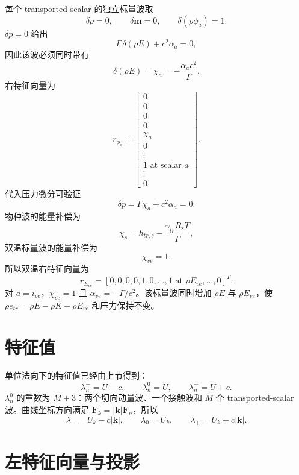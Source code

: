 \documentclass[11pt,a4paper,fontset=fandol]{ctexart}
\newcommand{\ve}{ve}
\newcommand{\tr}{tr}
\newcommand{\kk}{\bm{k}}
\newcommand{\FF}{\bm{F}}
\newcommand{\Gammaone}{\Gamma}
\begin{document}
每个 transported scalar 的独立标量波取
\[
\delta\rho=0,\qquad \delta\bm{m}=0,\qquad
\delta(\rho\phi_a)=1 .
\]
\(\delta p=0\) 给出
\[
\Gammaone\,\delta(\rho E)+c^2\alpha_a=0,
\]
因此该波必须同时带有
\[
\delta(\rho E)=\chi_a=-\frac{\alpha_a c^2}{\Gammaone}.
\]
右特征向量为
\[
r_{\phi_a}=
\begin{bmatrix}
0\\0\\0\\0\\\chi_a\\0\\\vdots\\1\text{ at scalar }a\\\vdots\\0
\end{bmatrix}.
\]
代入压力微分可验证
\[
\delta p
=\Gammaone\chi_a+c^2\alpha_a=0.
\]
物种波的能量补偿为
\[
\boxed{\chi_s
=h_{\tr,s}-\frac{\gamma_{\tr}R_sT}{\Gammaone}},
\]
双温标量波的能量补偿为
\[
\boxed{\chi_{\ve}=1}.
\]
所以双温右特征向量为
\[
r_{E_{\ve}}=[0,0,0,0,1,0,\ldots,1\text{ at }\rho E_{\ve},\ldots,0]^T .
\]
对 \(a=i_{\ve}\)，\(\chi_{\ve}=1\) 且
\(\alpha_{\ve}=-\Gammaone/c^2\)。该标量波同时增加
\(\rho E\) 与 \(\rho E_{\ve}\)，使
\(\rho e_{\tr}=\rho E-\rho K-\rho E_{\ve}\) 和压力保持不变。

\section{特征值}

单位法向下的特征值已经由上节得到：
\[
\lambda_n^- = U-c,\qquad
\lambda_n^0=U,\qquad
\lambda_n^+ = U+c .
\]
\(\lambda_n^0\) 的重数为 \(M+3\)：两个切向动量波、一个接触波和
\(M\) 个 transported-scalar 波。曲线坐标方向满足
\(\FF_k=|\kk|\FF_n\)，所以
\[
\boxed{\lambda_- = U_k-c|\kk|,\qquad
\lambda_0=U_k,\qquad
\lambda_+=U_k+c|\kk|}.
\]

\section{左特征向量与投影}
\end{document}
